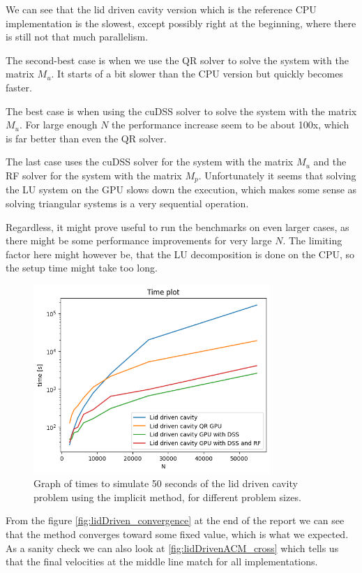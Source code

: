 \documentclass{article}
\begin{document}
We can see that the lid driven cavity version which is the reference CPU implementation 
is the slowest, except possibly right at the beginning, where there is still not that much 
parallelism. 

The second-best case is when we use the QR solver to solve the system with the matrix \(M_u\).
It starts of a bit slower than the CPU version but quickly becomes faster.

The best case is when using the cuDSS solver to solve the system with the matrix \(M_u\). For large 
enough \(N\) the performance increase seem to be about 100x, which is far better than even the QR 
solver.

The last case uses the cuDSS solver for the system with the matrix \(M_u\) and the 
RF solver for the system with the matrix \(M_p\). Unfortunately it seems that solving the  
LU system on the GPU slows down the execution, which makes some sense as solving triangular systems 
is a very sequential operation.

Regardless, it might prove useful to run the benchmarks on even larger cases, as there might be some 
performance improvements for very large \(N\). The limiting factor here might however be, that 
the LU decomposition is done on the CPU, so the setup time might take too long.
\begin{figure}[h!] 
    \centering 
    \includegraphics[width=0.8\textwidth]{lidDriven_time.png} 
    \caption{Graph of times to simulate 50 seconds of the lid driven cavity problem using
    the implicit method, for different problem sizes.} 
    \label{fig:lidDriven_time} 
\end{figure}

From the figure \ref{fig:lidDriven_convergence} at the end of the report we can see that the 
method converges toward some fixed value, which is what we expected. As a sanity check we can 
also look at \ref{fig:lidDrivenACM_cross} which tells us that the final velocities at the 
middle line match for all implementations.
\end{document}
